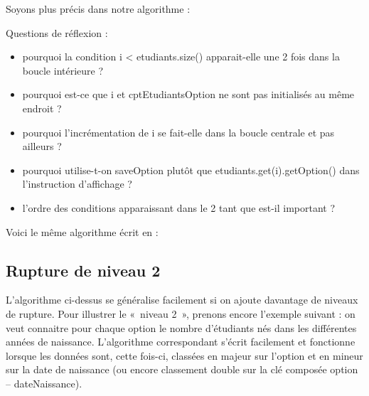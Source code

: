 	\newpage
	Soyons plus précis dans notre algorithme :

	\begin{algo}
		\label{algo:rupt1}
	\end{algo}

	\medskip
	Questions de réflexion :
	\begin{itemize}
		\item 
			pourquoi la condition \textsf{i < etudiants.size()}
			apparait-elle une 2\ieme{} fois dans la boucle intérieure ?
		\item 
			pourquoi est-ce que \textsf{i} et \textsf{cptEtudiantsOption} 
			ne sont pas initialisés au même endroit ?
		\item 
			pourquoi l'incrémentation de \textsf{i} se fait-elle dans la boucle centrale 
			et pas ailleurs ?
		\item 
			pourquoi utilise-t-on 
			\textsf{saveOption} plutôt que \textsf{etudiants.get(i).getOption()}
			dans l’instruction d’affichage ?
		\item 
			l’ordre des conditions apparaissant dans le 2\ieme{} \og{}tant que\fg{} 
			est-il important ?
	\end{itemize}

	Voici le même algorithme écrit en  :

\subsection*{Rupture de niveau 2}

	L’algorithme ci-dessus se généralise facilement si on ajoute davantage de niveaux de rupture. 
	Pour illustrer le «~niveau 2~», prenons encore l’exemple suivant : 
	on veut connaitre pour chaque option le nombre d’étudiants nés dans les différentes années de naissance. 
	L’algorithme correspondant s’écrit facilement et fonctionne lorsque les données sont, cette fois-ci,
	classées en majeur sur l'option et en mineur sur la date de naissance
	(ou encore classement double sur la clé composée option – dateNaissance).

